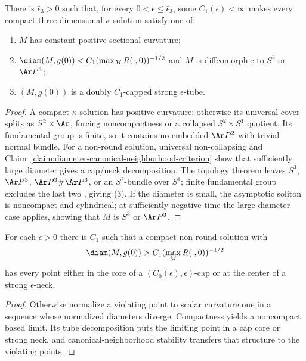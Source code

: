 \begin{theorem}\label{thm:compact-kappa-solution-structure}
\label{thmep3}
There is $\bar\epsilon_3>0$ such that, for every
$0<\epsilon\leq\bar\epsilon_3$, some $C_1(\epsilon)<\infty$ makes
every compact three-dimensional $\kappa$-solution satisfy one of:
\begin{enumerate}
\item[(1)] $M$ has constant positive sectional curvature;
\item[(2)]
$\diam(M,g(0))<C_1(\max_MR(\cdot,0))^{-1/2}$ and $M$ is
diffeomorphic to $S^3$ or $\Ar P^3$;
\item[(3)] $(M,g(0))$ is a doubly $C_1$-capped strong
$\epsilon$-tube.
\end{enumerate}
\end{theorem}
\begin{proof}
\sketch
{}
A compact $\kappa$-solution has positive curvature: otherwise its
universal cover splits as $S^2\times\Ar$, forcing noncompactness or
a collapsed $S^2\times S^1$ quotient. Its fundamental group is
finite, so it contains no embedded $\Ar P^2$ with trivial normal
bundle. For a non-round solution, universal non-collapsing and
Claim~\ref{claim:diameter-canonical-neighborhood-criterion} show
that sufficiently large diameter gives a cap/neck decomposition.
The topology theorem leaves $S^3$, $\Ar P^3$,
$\Ar P^3\#\Ar P^3$, or an $S^2$-bundle over $S^1$; finite
fundamental group excludes the last two \cite{Petersen}, giving (3).
If the diameter is small, the asymptotic soliton is noncompact and
cylindrical; at sufficiently negative time the large-diameter case
applies, showing that $M$ is $S^3$ or $\Ar P^3$.
\end{proof}

\begin{claim}\label{claim:diameter-canonical-neighborhood-criterion}
For each $\epsilon>0$ there is $C_1$ such that a compact non-round
solution with
\[
 \diam(M,g(0))>C_1(\max_MR(\cdot,0))^{-1/2}
\]
has every point either in the core of a
$(C_0(\epsilon),\epsilon)$-cap or at the center of a strong
$\epsilon$-neck.
\end{claim}
\begin{proof}
\sketch
{}
Otherwise normalize a violating point to scalar curvature one in a
sequence whose normalized diameters diverge. Compactness yields a
noncompact based limit. Its tube decomposition puts the limiting
point in a cap core or strong neck, and canonical-neighborhood
stability transfers that structure to the violating points.
\end{proof}

